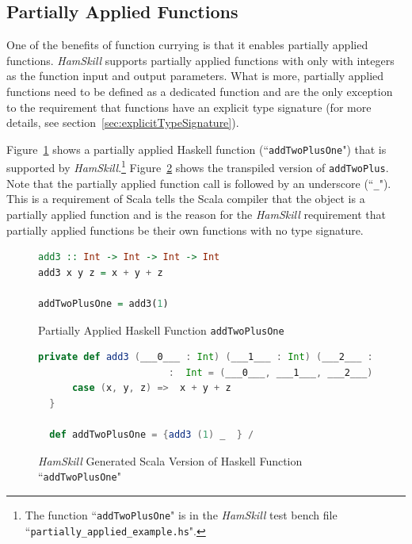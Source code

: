 \documentclass{report}
\begin{document}
\subsection{Partially Applied Functions}\label{sec:partiallyAppliedFunctions}

One of the benefits of function currying is that it enables partially applied functions.  \textit{HamSkill} supports partially applied functions with only with integers as the function input and output parameters.  What is more, partially applied functions need to be defined as a dedicated function and are the only exception to the requirement that functions have an explicit type signature (for more details, see section~\ref{sec:explicitTypeSignature}).  

Figure~\ref{fig:haskellFunctionAddTwoPlusOne} shows a partially applied Haskell function (``\texttt{addTwoPlusOne}") that is supported by \textit{HamSkill}.\footnote{The function ``\texttt{addTwoPlusOne}" is in the \textit{HamSkill} test bench file ``\texttt{partially\_applied\_example.hs}".}  Figure~\ref{fig:scalaFunctionAddTwoPlusOne} shows the transpiled version of \texttt{addTwoPlus}.  Note that the partially applied function call is followed by an underscore (``\texttt{\_}").  This is a requirement of Scala tells the Scala compiler that the object is a partially applied function and is the reason for the \textit{HamSkill} requirement that partially applied functions be their own functions with no type signature.

\begin{figure}[H]
\begin{mdframed}
\begin{lstlisting}[language=Haskell]
add3 :: Int -> Int -> Int -> Int
add3 x y z = x + y + z

addTwoPlusOne = add3(1)
\end{lstlisting}
\end{mdframed}
\caption{Partially Applied Haskell Function \texttt{addTwoPlusOne}}\label{fig:haskellFunctionAddTwoPlusOne}
\end{figure}

\begin{figure}[H]
\begin{mdframed}
\begin{lstlisting}[language=Scala, basicstyle=\scriptsize]
  private def add3 (___0___ : Int) (___1___ : Int) (___2___ : Int) 
                       :  Int = (___0___, ___1___, ___2___) match {
      case (x, y, z) =>  x + y + z
  } 

  def addTwoPlusOne = {add3 (1) _  } /
\end{lstlisting}
\end{mdframed}
\caption{\textit{HamSkill} Generated Scala Version of Haskell Function ``\texttt{addTwoPlusOne}"}\label{fig:scalaFunctionAddTwoPlusOne}
\end{figure}
\end{document}
